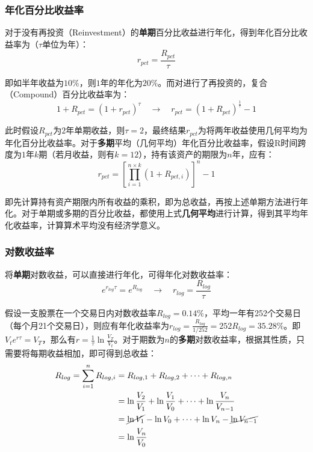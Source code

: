 \documentclass[11pt]{article}
\begin{document}
\subsubsection*{年化百分比收益率}

对于没有再投资（Reinvestment）的\textbf{单期}百分比收益进行年化，得到年化百分比收益率为（$\tau$单位为年）：
\begin{equation*}
    r_{pct} = \frac{R_{pct}}{\tau}
\end{equation*}

即如半年收益为$10\%$，则$1$年的年化为$20\%$。而对进行了再投资的，复合（Compound）百分比收益率为：
\begin{equation*}
    1+R_{pct} = (1+r_{pct})^\tau \quad\rightarrow\quad
    r_{pct} = (1+R_{pct})^{\frac{1}{\tau}} - 1
\end{equation*}

此时假设$R_{pct}$为$2$年单期收益，则$\tau = 2$，最终结果$r_{pct}$为将两年收益使用几何平均为年化百分比收益率。对于\textbf{多期}平均（几何平均）年化百分比收益率，假设R时间跨度为$1$年$k$期（若月收益，则有$k=12$），持有该资产的期限为$n$年，应有：
\begin{equation*}
    r_{pct} = \left[ \prod_{i=1}^{n\times k} (1+R_{pct,i}) \right]^{n} - 1
\end{equation*}

即先计算持有资产期限内所有收益的乘积，即为总收益，再按上述单期方法进行年化。对于单期或多期的百分比收益，都使用上式\textbf{几何平均}进行计算，得到其平均年化收益率，计算算术平均没有经济学意义。

\subsubsection*{对数收益率}

将\textbf{单期}对数收益，可以直接进行年化，可得年化对数收益率：
\begin{equation*}
    e^{r_{log}\tau} = e^{R_{log}} \quad\rightarrow\quad r_{log} = \frac{R_{log}}{\tau}
\end{equation*}

假设一支股票在一个交易日内对数收益率$R_{log}=0.14\%$，平均一年有252个交易日（每个月21个交易日），则应有年化收益率为$r_{log} = \frac{R_{log}}{1/252} = 252R_{log} = 35.28\%$。即$V_t e^{r\tau} = V_T$，那么有$r = \frac{1}{\tau} \ln \frac{V_T}{V_t}$。对于期数为$n$的\textbf{多期}对数收益率，根据其性质，只需要将每期收益相加，即可得到总收益：
\begin{align*}
    R_{log} = \sum^{n}_{i=1} R_{log,i} & = R_{log,1} + R_{log,2} + \dots + R_{log,n} \\ 
    &= \ln\frac{V_2}{V_1} + \ln\frac{V_1}{V_0} + \dots + \ln\frac{V_n}{V_{n-1}} \\
    &= \cancel{\ln V_1} - \ln V_0 + \dots + \ln V_n - \cancel{\ln V_{n-1}} \\
    &= \ln\frac{V_n}{V_0} 
\end{align*}
\end{document}
